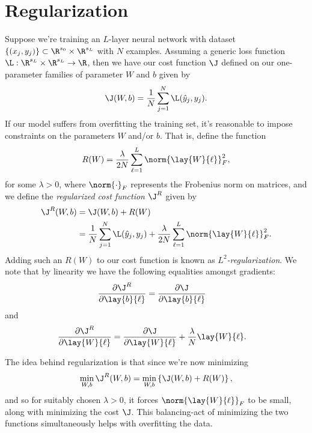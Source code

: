 

\section{Regularization}

Suppose we're training an $L$-layer neural network with dataset $\{(x_j,y_j)\}\subset\R^{s_0}\times\R^{s_L}$ with $N$ examples.  Assuming a generic loss function $\L:\R^{s_L}\times\R^{s_L}\to\R$, then we have our cost function $\J$ defined on our one-parameter families of parameter $W$ and $b$ given by
$$\J(W,b)=\frac{1}{N}\sum_{j=1}^N\L(\hat{y}_j,y_j).$$
If our model suffers from overfitting the training set, it's reasonable to impose constraints on the parameters $W$ and/or $b$.  That is, define the function
$$R(W)=\frac{\lambda}{2N}\sum_{\ell=1}^L\norm{\lay{W}{\ell}}_F^2,$$
for some $\lambda>0$, where $\norm{\cdot}_F$ represents the Frobenius norm on matrices, and we define the \textit{regularized cost function} $\J^R$ given by
\begin{align*}
	\J^R(W,b)&=\J(W,b)+R(W)\\
	&=\frac{1}{N}\sum_{j=1}^N\L(\hat{y}_j,y_j)+\frac{\lambda}{2N}\sum_{\ell=1}^L\norm{\lay{W}{\ell}}_F^2.
\end{align*}
Adding such an $R(W)$ to our cost function is known as \textit{$L^2$-regularization}.  We note that by linearity we have the following equalities amongst gradients:
\begin{align*}
	\frac{\partial\J^R}{\partial\lay{b}{\ell}}&=\frac{\partial\J}{\partial\lay{b}{\ell}}
\end{align*}
and
\begin{align*}
	\frac{\partial\J^R}{\partial\lay{W}{\ell}}&=\frac{\partial\J}{\partial\lay{W}{\ell}}+\frac{\lambda}{N}\lay{W}{\ell}.
\end{align*}

The idea behind regularization is that since we're now minimizing
$$\min_{W,b}\J^R(W,b)=\min_{W,b}\left\{\J(W,b)+R(W)\right\},$$
and so for suitably chosen $\lambda>0$, it forces $\norm{\lay{W}{\ell}}_F$ to be small, along with minimizing the cost $\J$.  This balancing-act of minimizing the two functions simultaneously helps with overfitting the data.

